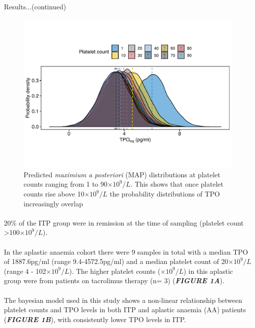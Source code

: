 \documentclass[landscape,a0paper,fontscale=0.285]{beamer} %
\newlength{\onecolwid}
\newlength{\twocolwid}
\begin{document}
\begin{frame}[t]
\begin{columns}[t]
\begin{column}{\twocolwid}
\begin{columns}[t,totalwidth=\twocolwid]
\begin{column}{\onecolwid}
\begin{block}{Results...(continued)}
\begin{figure}[H]
\includegraphics[width=1\linewidth]{fig/Probability_density.pdf}
\caption{Predicted \textit{maximium a posteriori} (MAP) distributions at platelet counts ranging from 1 to 90$\times 10^9/L$. This shows that once platelet counts rise above 10$\times 10^9/L$ the probability distributions of TPO increasingly overlap}
\end{figure}

\paragraph{}20\% of the ITP group were in remission at the time of sampling (platelet count >100$\times 10^9/L$).

\vspace{30pt}

\paragraph{} In the aplastic anaemia cohort there were 9 samples in total with a median TPO of 1887.6pg/ml (range 9.4-4572.5pg/ml) and a median platelet count of 20$\times 10^9/L$ (range 4 - 102$\times 10^9/L$). The higher platelet counts ($\times 10^9/L$) in this aplastic group were from patients on tacrolimus therapy (n= 3) (\textit{\textbf{FIGURE 1A}}). 

\vspace{30pt}

\paragraph{} The bayesian model used in this study shows a non-linear relationship between platelet counts and TPO levels in both ITP and aplastic anaemia (AA) patients (\textbf{\emph{FIGURE 1B}}), with consistently lower TPO levels in ITP. 


\end{block}
\end{column}
\end{columns}
\end{column}
\end{columns}
\end{frame}
\end{document}
